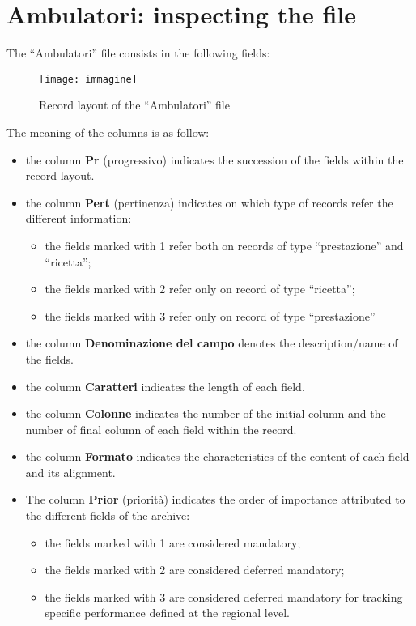 \documentclass[paper=a4, fontsize=11pt]{scrartcl} %
\numberwithin{equation}{section} %
\numberwithin{figure}{section} %
\numberwithin{table}{section} %
\begin{document}
\section{Ambulatori: inspecting the file}
The ``Ambulatori'' file consists in the following fields:
\begin{figure} [h]
\centering
\texttt{[image: immagine]}
\caption{Record layout of the ``Ambulatori'' file}\label{fig:1}
\end{figure}
\newpage
The meaning of the columns is as follow:
\begin{itemize}
\item the column \textbf{Pr} (progressivo) indicates the succession of the fields within the record layout.
\item the column \textbf{Pert} (pertinenza) indicates on which type of records refer the different information:
\begin{itemize}
\item the fields marked with 1 refer both on records of type ``prestazione'' and ``ricetta'';
\item the fields marked with 2 refer only on record of type ``ricetta'';
\item the fields marked with 3 refer only on record of type ``prestazione''
\end{itemize}
\item the column \textbf{Denominazione del campo} denotes the description/name of the fields.
\item the column \textbf{Caratteri} indicates the length of each field.
\item the column \textbf{Colonne} indicates the number of the initial column and the number of final column of each field within the record.
\item the column \textbf{Formato} indicates the characteristics of the content of each field and its alignment.
\item The column \textbf{Prior} (priorità) indicates the order of importance attributed to the different fields of the archive:
\begin{itemize}
\item the fields marked with 1 are considered mandatory;
\item the fields marked with 2 are considered deferred mandatory;
\item the fields marked with 3 are considered deferred mandatory for tracking specific performance defined at the regional level.
\end{itemize}
\end{itemize} 
\end{document}
